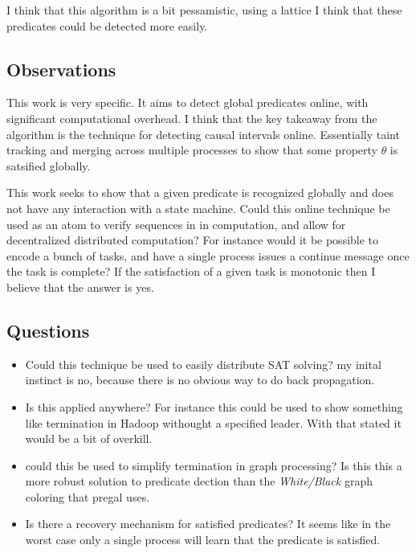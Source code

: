 I think that this algorithm is a bit pessamistic, using a lattice I think that
these predicates could be detected more easily.

\subsection{Observations} 

This work is very specific. It aims to detect global predicates online, with
significant computational overhead. I think that the key takeaway from the
algorithm is the technique for detecting causal intervals online. Essentially
taint tracking and merging across multiple processes to show that some property
$\theta$ is satsified globally.

This work seeks to show that a given predicate is recognized globally and does not have any interaction with a state machine. Could this online technique be used as an atom to verify sequences in in computation, and allow for decentralized distributed computation? For instance would it be possible to encode a bunch of tasks, and have a single process issues a continue message once the task is complete? If the satisfaction of a given task is monotonic then I believe that the answer is yes.

\subsection{Questions}

\begin{itemize}

    \item Could this technique be used to easily distribute SAT solving? my
inital instinct is no, because there is no obvious way to do back propagation.

    \item Is this applied anywhere? For instance this could be used to show
something like termination in Hadoop withought a specified leader. With that
stated it would be a bit of overkill.

    \item could this be used to simplify termination in graph processing? Is
this this a more robust solution to predicate dection than the
\textit{White/Black} graph coloring that pregal uses.

    \item Is there a recovery mechanism for satisfied predicates? It seems like
in the worst case only a single process will learn that the predicate is
satisfied.

\end{itemize}
